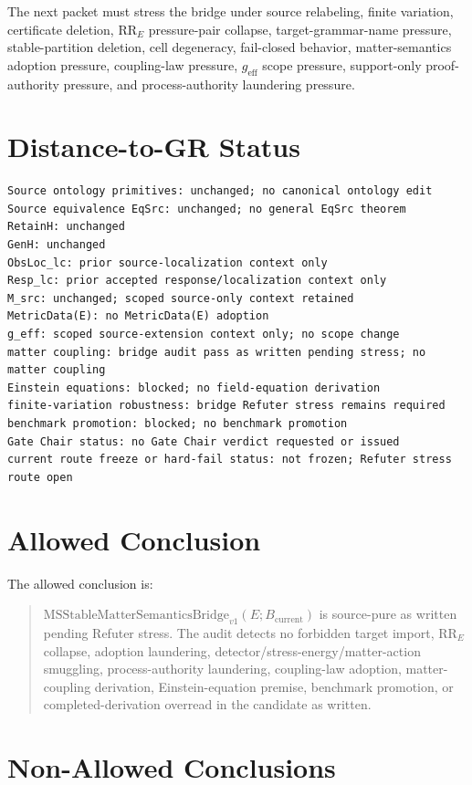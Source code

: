 \documentclass[11pt]{article}
\newcommand{\Bcur}{B_{\mathrm{current}}}
\newcommand{\MSBridge}{\mathrm{MSStableMatterSemanticsBridge}_{v1}}
\newcommand{\geff}{g_{\mathrm{eff}}}
\begin{document}
The next packet must stress the bridge under source relabeling, finite
variation, certificate deletion, \(\mathrm{RR}_E\) pressure-pair collapse,
target-grammar-name pressure, stable-partition deletion, cell degeneracy,
fail-closed behavior, matter-semantics adoption pressure, coupling-law
pressure, \(\geff\) scope pressure, support-only proof-authority pressure,
and process-authority laundering pressure.

\section{Distance-to-GR Status}

\begin{verbatim}
Source ontology primitives: unchanged; no canonical ontology edit
Source equivalence EqSrc: unchanged; no general EqSrc theorem
RetainH: unchanged
GenH: unchanged
ObsLoc_lc: prior source-localization context only
Resp_lc: prior accepted response/localization context only
M_src: unchanged; scoped source-only context retained
MetricData(E): no MetricData(E) adoption
g_eff: scoped source-extension context only; no scope change
matter coupling: bridge audit pass as written pending stress; no matter coupling
Einstein equations: blocked; no field-equation derivation
finite-variation robustness: bridge Refuter stress remains required
benchmark promotion: blocked; no benchmark promotion
Gate Chair status: no Gate Chair verdict requested or issued
current route freeze or hard-fail status: not frozen; Refuter stress route open
\end{verbatim}

\section{Allowed Conclusion}

The allowed conclusion is:
\begin{quote}
\(\MSBridge(E;\Bcur)\) is source-pure as written pending Refuter stress. The
audit detects no forbidden target import, \(\mathrm{RR}_E\) collapse,
adoption laundering, detector/stress-energy/matter-action smuggling,
process-authority laundering, coupling-law adoption, matter-coupling
derivation, Einstein-equation premise, benchmark promotion, or
completed-derivation overread in the candidate as written.
\end{quote}

\section{Non-Allowed Conclusions}
\end{document}
